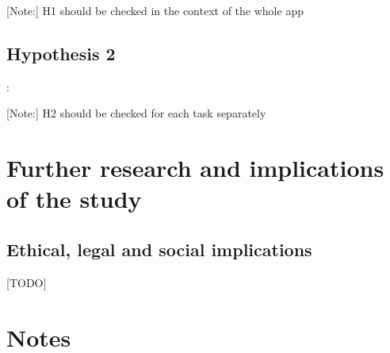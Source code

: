 	[Note:] H1 should be checked in the context of the whole app
	
	\subsection{Hypothesis 2}: 
	
	[Note:] H2 should be checked for each task separately

\section{Further research and implications of the study}

\subsection{Ethical, legal and social implications}

[TODO]

\section{Notes}




